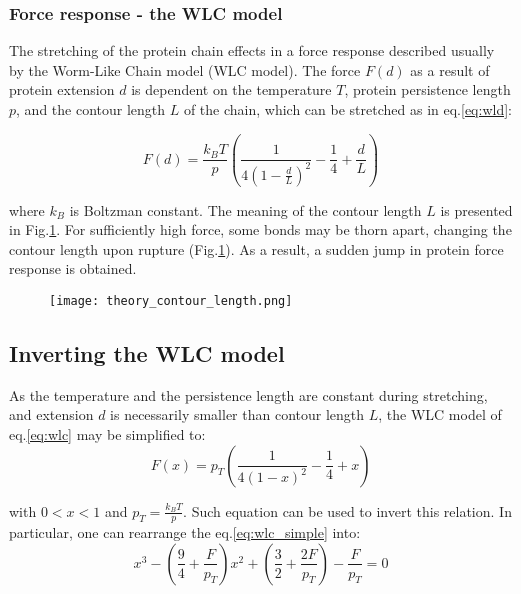 \documentclass[11pt]{article}
\begin{document}
\subsubsection{Force response - the WLC model}
\label{subsec:wlc}
The stretching of the protein chain effects in a force response described usually by the Worm-Like Chain model (WLC model).
The force $F(d)$ as a result of protein extension $d$ is dependent on the temperature $T$, protein persistence length $p$, and the contour length $L$ of the chain, which can be stretched as in eq.\ref{eq:wld}:

\begin{equation}
    \label{eq:wlc}
    F(d) = \frac{k_{B}T}{p}\left(\frac{1}{4(1-\frac{d}{L})^2}-\frac{1}{4}+\frac{d}{L}\right)
\end{equation}

where $k_B$ is Boltzman constant.
The meaning of the contour length $L$ is presented in Fig.\ref{fig:theory_contour_length}.
For sufficiently high force, some bonds may be thorn apart, changing the contour length upon rupture (Fig.\ref{fig:theory_contour_length}).
As a result, a sudden jump in protein force response is obtained.

\begin{figure}
    \texttt{[image: theory\_contour\_length.png]}
    \caption{}
    \label{fig:theory_contour_length}
\end{figure}

\subsection{Inverting the WLC model}
\label{subsec:inverting}
As the temperature and the persistence length are constant during stretching, and extension $d$ is necessarily smaller than contour length $L$, the WLC model of eq.\ref{eq:wlc} may be simplified to:
\begin{equation}
    \label{eq:wlc_simple}
    F(x) = p_T\left(\frac{1}{4(1-x)^2}-\frac{1}{4}+x\right)
\end{equation}

with $0\lt x \lt 1$ and $p_T=\frac{k_{B}T}{p}$.
Such equation can be used to invert this relation.
In particular, one can rearrange the eq.\ref{eq:wlc_simple} into:
\begin{equation}
    \label{eq:wlc_polynomial}
    x^3 - (\frac{9}{4}+\frac{F}{p_T})x^2 + (\frac{3}{2}+\frac{2F}{p_T}) - \frac{F}{p_T} = 0
\end{equation}
\end{document}
